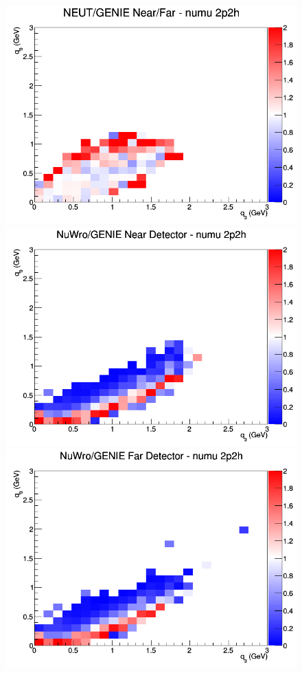 \documentclass[12pt]{article}
\begin{document}
\begin{figure}[h]
\endminipage
{}
\includegraphics[width=\linewidth]{eff_q0_q3/LAr/ratios/2p2h_NEUT_GENIE_numu_NF_q3_q0.png}
\endminipage
\newline
{}
\includegraphics[width=\linewidth]{eff_q0_q3/LAr/ratios/2p2h_NuWro_GENIE_numu_near_q3_q0.png}
\endminipage
{}
\includegraphics[width=\linewidth]{eff_q0_q3/LAr/ratios/2p2h_NuWro_GENIE_numu_far_q3_q0.png}

\end{figure}
\end{document}
